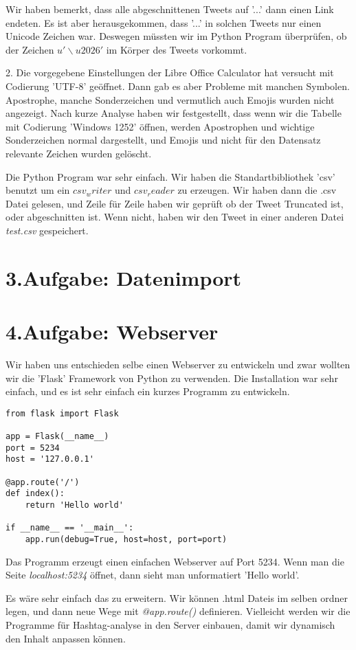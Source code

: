 Wir haben bemerkt, dass alle abgeschnittenen Tweets auf '...' dann einen Link endeten. Es ist aber herausgekommen, dass '...' in solchen Tweets nur einen Unicode Zeichen war.  Deswegen müssten wir im Python Program überprüfen, ob der Zeichen \textit{$u'\backslash u2026'$} im Körper des Tweets vorkommt.

2. Die vorgegebene Einstellungen der Libre Office Calculator hat versucht mit Codierung 'UTF-8' geöffnet. Dann gab es aber Probleme mit manchen Symbolen. Apostrophe, manche Sonderzeichen und vermutlich auch Emojis wurden nicht angezeigt. Nach kurze Analyse haben wir festgestellt, dass wenn wir die Tabelle mit Codierung 'Windows 1252' öffnen, werden Apostrophen und wichtige Sonderzeichen normal dargestellt, und Emojis und nicht für den Datensatz relevante Zeichen wurden gelöscht.

Die Python Program war sehr einfach. Wir haben die Standartbibliothek 'csv' benutzt um ein $csv_writer$ und $csv_reader$ zu erzeugen. Wir haben dann die .csv Datei gelesen, und Zeile für Zeile haben wir geprüft ob der Tweet Truncated ist, oder abgeschnitten ist. Wenn nicht, haben wir den Tweet in einer anderen Datei \textit{test.csv} gespeichert. 

\section*{3.Aufgabe: Datenimport}


\section*{4.Aufgabe: Webserver}

Wir haben uns entschieden selbe einen Webserver zu entwickeln und zwar wollten wir die 'Flask' Framework von Python zu verwenden. Die Installation war sehr einfach, und es ist sehr einfach ein kurzes Programm zu entwickeln.

\begin{verbatim}
from flask import Flask

app = Flask(__name__)
port = 5234
host = '127.0.0.1'

@app.route('/')
def index():
    return 'Hello world'

if __name__ == '__main__':
    app.run(debug=True, host=host, port=port)
\end{verbatim}
Das Programm erzeugt einen einfachen Webserver auf Port 5234. Wenn man die Seite 
\textit{localhost:5234} öffnet, dann sieht man unformatiert 'Hello world'.

Es wäre sehr einfach das zu erweitern. Wir können .html Dateis im selben ordner legen, und dann neue Wege mit \textit{@app.route()} definieren. Vielleicht werden wir die Programme für Hashtag-analyse in den Server einbauen, damit wir dynamisch den Inhalt anpassen können.




